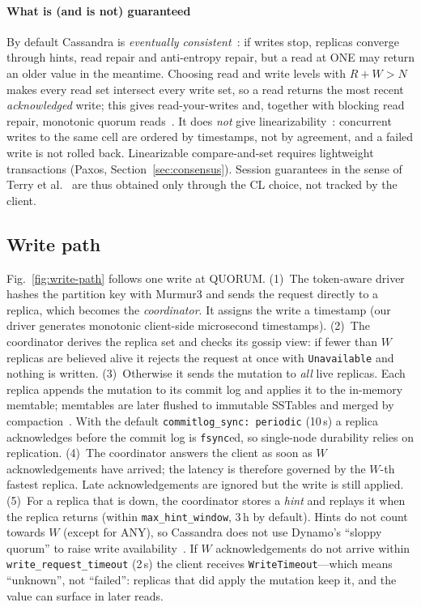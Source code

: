 \paragraph{What is (and is not) guaranteed}
By default Cassandra is \emph{eventually consistent}~\cite{vogels2009eventually}: if writes
stop, replicas converge through hints, read repair and anti-entropy repair, but a read at
ONE may return an older value in the meantime. Choosing read and write levels with
$R + W > N$ makes every read set intersect every write set, so a read returns the most
recent \emph{acknowledged} write; this gives read-your-writes and, together with blocking
read repair, monotonic quorum reads~\cite{cassdoc-readrepair}. It does \emph{not} give
linearizability~\cite{herlihy1990linearizability}: concurrent writes to the same cell are
ordered by timestamps, not by agreement, and a failed write is not rolled back.
Linearizable compare-and-set requires lightweight transactions (Paxos,
Section~\ref{sec:consensus}). Session guarantees in the sense of Terry et
al.~\cite{terry1994session} are thus obtained only through the CL choice, not tracked by
the client.

\subsection{Write path}

Fig.~\ref{fig:write-path} follows one write at QUORUM.
(1)~The token-aware driver hashes the partition key with Murmur3 and sends the request
directly to a replica, which becomes the \emph{coordinator}. It assigns the write a
timestamp (our driver generates monotonic client-side microsecond timestamps).
(2)~The coordinator derives the replica set and checks its gossip view: if fewer than $W$
replicas are believed alive it rejects the request at once with \texttt{Unavailable} and
nothing is written.
(3)~Otherwise it sends the mutation to \emph{all} live replicas. Each replica appends the
mutation to its commit log and applies it to the in-memory memtable; memtables are later
flushed to immutable SSTables and merged by compaction~\cite{cassdoc-storage}. With the
default \texttt{commitlog\_sync: periodic} (10\,s) a replica acknowledges before the
commit log is \texttt{fsync}ed, so single-node durability relies on replication.
(4)~The coordinator answers the client as soon as $W$ acknowledgements have arrived; the
latency is therefore governed by the $W$-th fastest replica. Late acknowledgements are
ignored but the write is still applied.
(5)~For a replica that is down, the coordinator stores a \emph{hint} and replays it when
the replica returns (within \texttt{max\_hint\_window}, 3\,h by default). Hints do not count
towards $W$ (except for ANY), so Cassandra does not use Dynamo's ``sloppy quorum'' to
raise write availability~\cite{cassdoc-hints,decandia2007dynamo}.
If $W$ acknowledgements do not arrive within \texttt{write\_request\_timeout} (2\,s) the
client receives \texttt{WriteTimeout}---which means ``unknown'', not ``failed'': replicas that
did apply the mutation keep it, and the value can surface in later reads.

